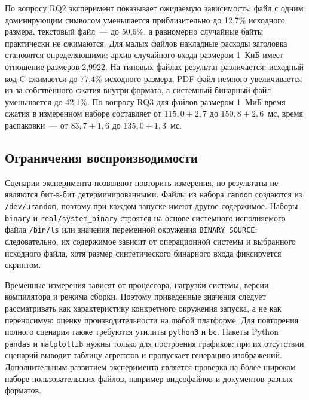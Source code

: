 По вопросу RQ2 эксперимент показывает ожидаемую зависимость: файл с одним
доминирующим символом уменьшается приблизительно до 12,7\% исходного размера,
текстовый файл~--- до 50,6\%, а равномерно случайные байты практически не
сжимаются. Для малых файлов накладные расходы заголовка становятся
определяющими: архив случайного входа размером 1~КиБ имеет отношение размеров
2,9922. На типовых файлах результат различается: исходный код C сжимается до
77,4\% исходного размера, PDF-файл немного увеличивается из-за собственного
сжатия внутри формата, а системный бинарный файл уменьшается до 42,1\%. По
вопросу RQ3 для файлов размером 1~МиБ время сжатия в измеренном наборе
составляет от $115{,}0 \pm 2{,}7$ до $150{,}8 \pm 2{,}6$~мс, время
распаковки~--- от $83{,}7 \pm 1{,}6$ до $135{,}0 \pm 1{,}3$~мс.

\subsection{Ограничения воспроизводимости}

Сценарии эксперимента позволяют повторить измерения, но результаты не являются
бит-в-бит детерминированными. Файлы из набора \texttt{random} создаются из
\texttt{/dev/urandom}, поэтому при каждом запуске имеют другое содержимое.
Наборы \texttt{binary} и \texttt{real/system\_binary} строятся на основе
системного исполняемого файла \texttt{/bin/ls} или значения переменной окружения
\texttt{BINARY\_SOURCE}; следовательно, их содержимое зависит от операционной
системы и выбранного исходного файла, хотя размер синтетического бинарного
входа фиксируется скриптом.

Временные измерения зависят от процессора, нагрузки системы, версии компилятора
и режима сборки. Поэтому приведённые значения следует рассматривать как
характеристику конкретного окружения запуска, а не как переносимую оценку
производительности на любой платформе. Для повторения полного сценария также
требуются утилиты \texttt{python3} и \texttt{bc}. Пакеты Python
\texttt{pandas} и \texttt{matplotlib} нужны только для построения графиков: при
их отсутствии сценарий выводит таблицу агрегатов и пропускает генерацию
изображений. Дополнительным развитием эксперимента является
проверка на более широком наборе пользовательских файлов, например видеофайлов
и документов разных форматов.
